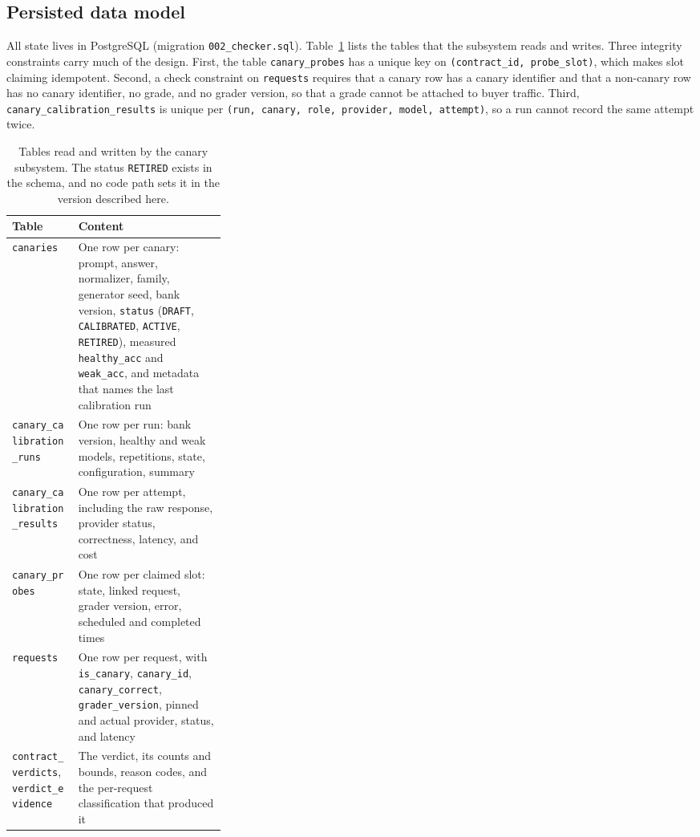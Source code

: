 \subsection{Persisted data model}
\label{sec:data_model}

All state lives in PostgreSQL (migration \texttt{002\_checker.sql}).
Table~\ref{tab:tables} lists the tables that the subsystem reads and writes.
Three integrity constraints carry much of the design.
First, the table \texttt{canary\_probes} has a unique key on
\texttt{(contract\_id, probe\_slot)}, which makes slot claiming idempotent.
Second, a check constraint on \texttt{requests} requires that a canary row has
a canary identifier and that a non-canary row has no canary identifier, no
grade, and no grader version, so that a grade cannot be attached to buyer
traffic. Third, \texttt{canary\_calibration\_results} is unique per
\texttt{(run, canary, role, provider, model, attempt)}, so a run cannot record
the same attempt twice.

\begin{table}[htbp]
  \centering
  \small
  \begin{tabularx}{\linewidth}{@{}p{0.31\linewidth}X@{}}
    \toprule
    Table & Content \\
    \midrule
    \texttt{canaries} & One row per canary: prompt, answer, normalizer, family,
      generator seed, bank version, \texttt{status} (\texttt{DRAFT},
      \texttt{CALIBRATED}, \texttt{ACTIVE}, \texttt{RETIRED}), measured
      \texttt{healthy\_acc} and \texttt{weak\_acc}, and metadata that names the
      last calibration run \\
    \texttt{canary\_calibration\_runs} & One row per run: bank version,
      healthy and weak models, repetitions, state, configuration, summary \\
    \texttt{canary\_calibration\_results} & One row per attempt, including the
      raw response, provider status, correctness, latency, and cost \\
    \texttt{canary\_probes} & One row per claimed slot: state, linked request,
      grader version, error, scheduled and completed times \\
    \texttt{requests} & One row per request, with \texttt{is\_canary},
      \texttt{canary\_id}, \texttt{canary\_correct}, \texttt{grader\_version},
      pinned and actual provider, status, and latency \\
    \texttt{contract\_verdicts}, \texttt{verdict\_evidence} & The verdict, its
      counts and bounds, reason codes, and the per-request classification
      that produced it \\
    \bottomrule
  \end{tabularx}
  \caption{Tables read and written by the canary subsystem. The status
  \texttt{RETIRED} exists in the schema, and no code path sets it in the
  version described here.}
  \label{tab:tables}
\end{table}

